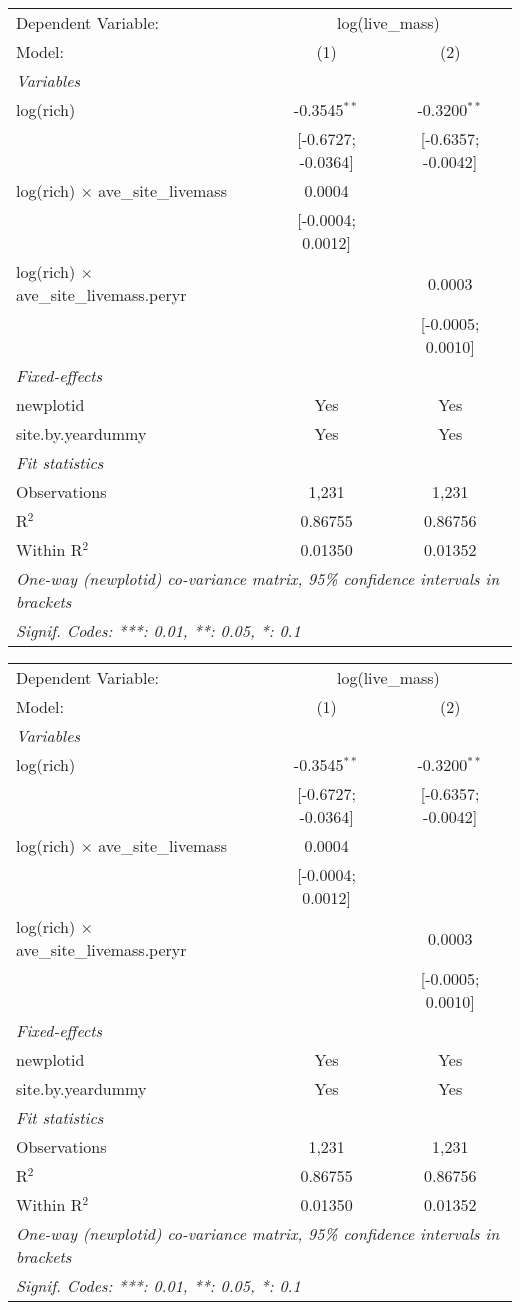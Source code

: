 \begin{tabular}{lcc}
\tabularnewline\midrule\midrule
Dependent Variable:&\multicolumn{2}{c}{log(live\_mass)}\\
Model:&(1) & (2)\\
\midrule \emph{Variables}&   &  \\
log(rich)&-0.3545$^{**}$ & -0.3200$^{**}$\\
  &[-0.6727; -0.0364] & [-0.6357; -0.0042]\\
log(rich) $\times $ ave\_site\_livemass&0.0004 &   \\
  &[-0.0004; 0.0012] &   \\
log(rich) $\times $ ave\_site\_livemass.peryr&   & 0.0003\\
  &   & [-0.0005; 0.0010]\\
\midrule \emph{Fixed-effects}&   &  \\
newplotid & Yes & Yes\\
site.by.yeardummy & Yes & Yes\\
\midrule \emph{Fit statistics}&  & \\
Observations & 1,231&1,231\\
R$^2$ & 0.86755&0.86756\\
Within R$^2$ & 0.01350&0.01352\\
\midrule\midrule\multicolumn{3}{l}{\emph{One-way (newplotid) co-variance matrix, 95\% confidence intervals in brackets}}\\
\multicolumn{3}{l}{\emph{Signif. Codes: ***: 0.01, **: 0.05, *: 0.1}}\\
\end{tabular}


\begin{tabular}{lcc}
\tabularnewline\midrule\midrule
Dependent Variable:&\multicolumn{2}{c}{log(live\_mass)}\\
Model:&(1) & (2)\\
\midrule \emph{Variables}&   &  \\
log(rich)&-0.3545$^{**}$ & -0.3200$^{**}$\\
  &[-0.6727; -0.0364] & [-0.6357; -0.0042]\\
log(rich) $\times $ ave\_site\_livemass&0.0004 &   \\
  &[-0.0004; 0.0012] &   \\
log(rich) $\times $ ave\_site\_livemass.peryr&   & 0.0003\\
  &   & [-0.0005; 0.0010]\\
\midrule \emph{Fixed-effects}&   &  \\
newplotid & Yes & Yes\\
site.by.yeardummy & Yes & Yes\\
\midrule \emph{Fit statistics}&  & \\
Observations & 1,231&1,231\\
R$^2$ & 0.86755&0.86756\\
Within R$^2$ & 0.01350&0.01352\\
\midrule\midrule\multicolumn{3}{l}{\emph{One-way (newplotid) co-variance matrix, 95\% confidence intervals in brackets}}\\
\multicolumn{3}{l}{\emph{Signif. Codes: ***: 0.01, **: 0.05, *: 0.1}}\\
\end{tabular}


